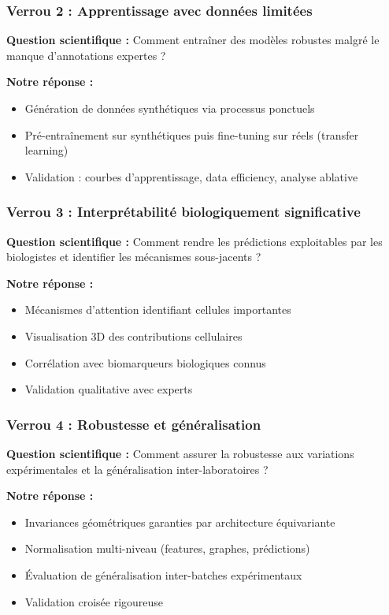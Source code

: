 \subsubsection{Verrou 2 : Apprentissage avec données limitées}

\textbf{Question scientifique :} Comment entraîner des modèles robustes malgré le manque d'annotations expertes ?

\textbf{Notre réponse :}
\begin{itemize}
    \item Génération de données synthétiques via processus ponctuels
    \item Pré-entraînement sur synthétiques puis fine-tuning sur réels (transfer learning)
    \item Validation : courbes d'apprentissage, data efficiency, analyse ablative
\end{itemize}

\subsubsection{Verrou 3 : Interprétabilité biologiquement significative}

\textbf{Question scientifique :} Comment rendre les prédictions exploitables par les biologistes et identifier les mécanismes sous-jacents ?

\textbf{Notre réponse :}
\begin{itemize}
    \item Mécanismes d'attention identifiant cellules importantes
    \item Visualisation 3D des contributions cellulaires
    \item Corrélation avec biomarqueurs biologiques connus
    \item Validation qualitative avec experts
\end{itemize}

\subsubsection{Verrou 4 : Robustesse et généralisation}

\textbf{Question scientifique :} Comment assurer la robustesse aux variations expérimentales et la généralisation inter-laboratoires ?

\textbf{Notre réponse :}
\begin{itemize}
    \item Invariances géométriques garanties par architecture équivariante
    \item Normalisation multi-niveau (features, graphes, prédictions)
    \item Évaluation de généralisation inter-batches expérimentaux
    \item Validation croisée rigoureuse
\end{itemize}

